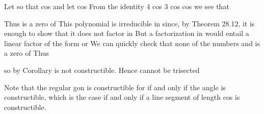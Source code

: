 \documentclass[11pt,oneside]{article}
\begin{document}
\begin{BookBody}
[We realize that some students have not seen the trigonometric identities we just used. Exercise 1 repeats Exercise 42 of Section 3 and asks you to prove the identity cos \BookInline{3\theta = 4} cos\BookInline{3\theta - 3} cos \BookInline{\theta } from Euler’s formula.]

Let  so that cos  and let \BookInline{\alpha = } cos  From the identity 4 cos\BookInline{3\theta - } 3 cos \BookInline{\theta = } cos \BookInline{3\theta,\allowbreak } we see that

\begin{center}\begin{adjustbox}{max width=\linewidth}\end{adjustbox}\end{center}

\noindent Thus \BookInline{\alpha } is a zero of  This polynomial is irreducible in  since, by Theorem 28.12, it is enough to show that it does not factor in  But a factorization in  would entail a linear factor of the form  or  We can quickly check that none of the numbers  and  is a zero of   Thus

\begin{center}\begin{adjustbox}{max width=\linewidth}\end{adjustbox}\end{center}

\noindent so by Corollary  is not constructible. Hence  cannot be trisected\BookEnd{\blacklozenge}

Note that the regular gon is constructible for  if and only if the angle  is constructible, which is the case if and only if a line segment of length cos is constructible.

\end{BookBody}
\end{document}
